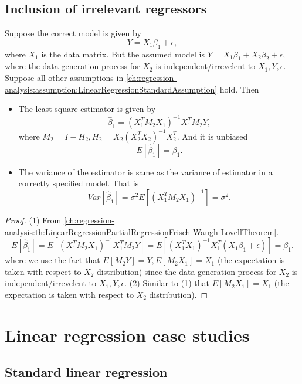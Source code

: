\begin{refsection}
\begin{example}
\end{example}


\subsection{Inclusion of irrelevant regressors}

\begin{lemma}
	Suppose the correct model is given by
	$$Y = X_1\beta_1 + \epsilon,$$
	where $X_1$ is the data matrix.
	But the assumed model is $Y = X_1\beta_1 + X_2\beta_2 + \epsilon$, where the data generation process for $X_2$ is independent/irrevelent to $X_1, Y, \epsilon$. 
	Suppose all other assumptions in \autoref{ch:regression-analysis:assumption:LinearRegressionStandardAssumption} hold.
	Then
	\begin{itemize}
		\item The least square estimator is given by $$\hat{\beta}_1 = (X_1^TM_2X_1)^{-1}X_1^TM_2Y,$$
		where $M_2 = I - H_2, H_2 = X_2(X_2^TX_2)^{-1}X_2^T$. And it is unbiased
		$$E[\hat{\beta}_1] = \beta_1.$$
		\item The variance of the estimator is same as the variance of estimator in a correctly specified model. That is
		$$Var[\hat{\beta}_1] = \sigma^2 E[(X_1^TM_2X_1)^{-1}] = \sigma^2. $$		
	\end{itemize}	
\end{lemma}
\begin{proof}
(1) From \autoref{ch:regression-analysis:th:LinearRegressionPartialRegressionFrisch-Waugh-LovellTheorem}.
$$E[\hat{\beta}_1] = E[(X_1^TM_2X_1)^{-1}X_1^TM_2Y] = E[(X_1^TX_1)^{-1}X_1^T(X_1\beta_1 + \epsilon)] = \beta_1.$$
where we use the fact that $E[M_2Y] = Y, E[M_2X_1] = X_1$ (the expectation is taken with respect to $X_2$ distribution) since the data generation process for $X_2$ is independent/irrevelent to $X_1, Y, \epsilon$. 
(2) Similar to (1) that $E[M_2X_1] = X_1$ (the expectation is taken with respect to $X_2$ distribution).
\end{proof}



\section{Linear regression case studies}

\subsection{Standard linear regression}




\end{refsection}
